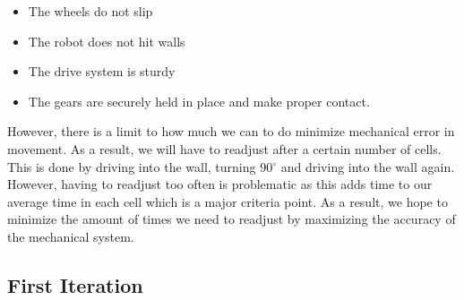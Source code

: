 \documentclass[11pt]{article}
\begin{document}
\begin{itemize}
\item The wheels do not slip
\item The robot does not hit walls
\item The drive system is sturdy 
\item The gears are securely held in place and make proper contact. 
\end{itemize}
However, there is a limit to how much we can to do minimize mechanical error in movement. As a result, we will have to readjust after a certain number of cells. This is done by driving into the wall, turning 90$^{\circ}$ and driving into the wall again. However, having to readjust too often is problematic as this adds time to our average time in each cell which is a major criteria point. As a result, we hope to minimize the amount of times we need to readjust by maximizing the accuracy of the mechanical system. 
\newpage

\subsection{First Iteration}
\end{document}
